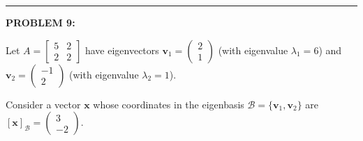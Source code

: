 \documentclass[12pt]{amsart}
\newcommand{\divider}{
  \vspace{-1em} %
  \noindent
  \raisebox{-0.15ex}{\textbullet}%
  \hspace{0.5em}%
  \rule[0.5ex]{0.95\textwidth}{1.0pt}%
  \hspace{0.5em}%
  \raisebox{-0.15ex}{\textbullet}%
  \vspace{0em} %
}
\begin{document}

\divider

{\bf PROBLEM 9:}

Let $A = \begin{bmatrix} 5 & 2 \\ 2 & 2 \end{bmatrix}$ have eigenvectors $\mathbf{v}_1 = \begin{pmatrix} 2 \\ 1 \end{pmatrix}$ (with eigenvalue $\lambda_1 = 6$) and $\mathbf{v}_2 = \begin{pmatrix} -1 \\ 2 \end{pmatrix}$ (with eigenvalue $\lambda_2 = 1$).

Consider a vector $\mathbf{x}$ whose coordinates in the eigenbasis $\mathcal{B} = \{\mathbf{v}_1, \mathbf{v}_2\}$ are $[\mathbf{x}]_{\mathcal{B}} = \begin{pmatrix} 3 \\ -2 \end{pmatrix}$. 
\end{document}
